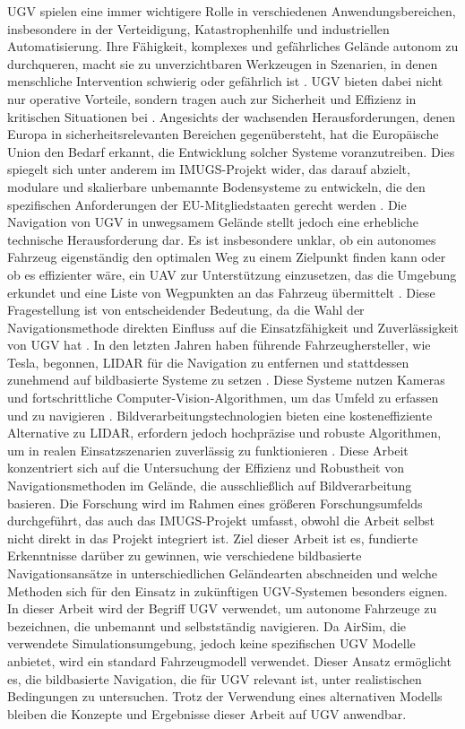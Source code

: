 \ac{UGV} spielen eine immer wichtigere Rolle in verschiedenen Anwendungsbereichen, insbesondere in der Verteidigung, Katastrophenhilfe und industriellen Automatisierung. 
Ihre Fähigkeit, komplexes und gefährliches Gelände autonom zu durchqueren, macht sie zu unverzichtbaren Werkzeugen in Szenarien, in denen menschliche Intervention schwierig oder gefährlich ist \cite{uav:ugv:search:rescue}. 
\ac{UGV} bieten dabei nicht nur operative Vorteile, sondern tragen auch zur Sicherheit und Effizienz in kritischen Situationen bei \cite{ugv:system:indonesia}. 
Angesichts der wachsenden Herausforderungen, denen Europa in sicherheitsrelevanten Bereichen gegenübersteht, hat die Europäische Union den Bedarf erkannt, die Entwicklung solcher Systeme voranzutreiben. 
Dies spiegelt sich unter anderem im \ac{IMUGS}-Projekt wider, das darauf abzielt, modulare und skalierbare unbemannte Bodensysteme zu entwickeln, die den spezifischen Anforderungen der EU-Mitgliedstaaten gerecht werden \cite{mil:ugv:attitudes}.
Die Navigation von \ac{UGV} in unwegsamem Gelände stellt jedoch eine erhebliche technische Herausforderung dar. 
Es ist insbesondere unklar, ob ein autonomes Fahrzeug eigenständig den optimalen Weg zu einem Zielpunkt finden kann oder ob es effizienter wäre, ein \ac{UAV} zur Unterstützung einzusetzen, das die Umgebung erkundet und eine Liste von Wegpunkten an das Fahrzeug übermittelt \cite{ugv:coverage:energy:efficient}. 
Diese Fragestellung ist von entscheidender Bedeutung, da die Wahl der Navigationsmethode direkten Einfluss auf die Einsatzfähigkeit und Zuverlässigkeit von \ac{UGV} hat \cite{ugv:uav:cooperative:ranging}.
In den letzten Jahren haben führende Fahrzeughersteller, wie Tesla, begonnen, \gls{LIDAR} für die Navigation zu entfernen und stattdessen zunehmend auf bildbasierte Systeme zu setzen \cite{website:tesla:suppport}. 
Diese Systeme nutzen Kameras und fortschrittliche Computer-Vision-Algorithmen, um das Umfeld zu erfassen und zu navigieren \cite{website:tesla:suppport}. 
Bildverarbeitungstechnologien bieten eine kosteneffiziente Alternative zu \gls{LIDAR}, erfordern jedoch hochpräzise und robuste Algorithmen, um in realen Einsatzszenarien zuverlässig zu funktionieren \cite{mil:ugv:attitudes}.
Diese Arbeit konzentriert sich auf die Untersuchung der Effizienz und Robustheit von Navigationsmethoden im Gelände, die ausschließlich auf Bildverarbeitung basieren. 
Die Forschung wird im Rahmen eines größeren Forschungsumfelds durchgeführt, das auch das \ac{IMUGS}-Projekt umfasst, obwohl die Arbeit selbst nicht direkt in das Projekt integriert ist. 
Ziel dieser Arbeit ist es, fundierte Erkenntnisse darüber zu gewinnen, wie verschiedene bildbasierte Navigationsansätze in unterschiedlichen Geländearten abschneiden und welche Methoden sich für den Einsatz in zukünftigen \ac{UGV}-Systemen besonders eignen.
In dieser Arbeit wird der Begriff \ac{UGV} verwendet, um autonome Fahrzeuge zu bezeichnen, die unbemannt und selbstständig navigieren. 
Da \gls{AirSim}, die verwendete Simulationsumgebung, jedoch keine spezifischen \ac{UGV} Modelle anbietet, wird ein standard Fahrzeugmodell verwendet. 
Dieser Ansatz ermöglicht es, die bildbasierte Navigation, die für \ac{UGV} relevant ist, unter realistischen Bedingungen zu untersuchen. 
Trotz der Verwendung eines alternativen Modells bleiben die Konzepte und Ergebnisse dieser Arbeit auf \ac{UGV} anwendbar.
